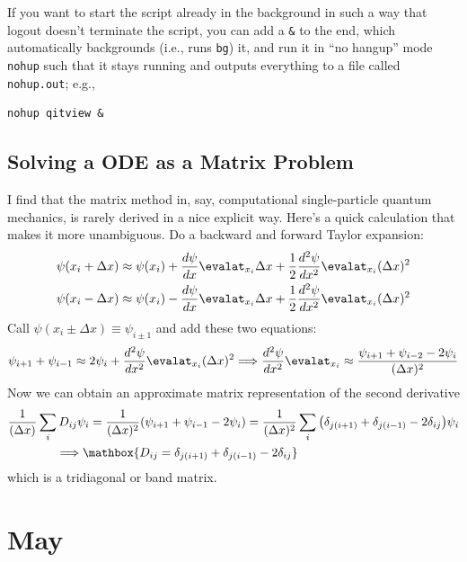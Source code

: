 \documentclass{report}
\begin{document}
If you want to start the script already in the background in such a way that 
logout doesn't terminate the script, you can add a \texttt{&} to the 
end, which automatically backgrounds (i.e., runs \texttt{bg}) it, and
run it in ``no hangup'' mode \texttt{nohup} such that it stays
running and outputs everything to a file called \texttt{nohup.out};
e.g., 
\begin{verbatim}
nohup qitview &
\end{verbatim}

\section{Solving a ODE as a Matrix Problem}
I find that the matrix method in, say, computational single-particle quantum 
mechanics, is rarely derived in a nice explicit way. Here's a quick calculation 
that makes it more unambiguous. Do a backward and forward Taylor expansion:
\begin{align*}
	\psi(x_i + \Delta x) \approx \psi(x_i) + \frac{d\psi}{dx}\evalat_{x_i}\Delta x 
		+ \frac{1}{2} \frac{d^2\psi}{dx^2}\evalat_{x_i}(\Delta x)^2\\
	\psi(x_i - \Delta x) \approx \psi(x_i) - \frac{d\psi}{dx}\evalat_{x_i}\Delta x 
		+ \frac{1}{2} \frac{d^2\psi}{dx^2}\evalat_{x_i}(\Delta x)^2
\end{align*}
Call $ \psi(x_i\pm \Delta x) \equiv \psi_{i\pm 1}$ and add these two equations:
\begin{equation*}
	\psi_{i+1} + \psi_{i-1} \approx 2\psi_i 
		+ \frac{d^2\psi}{dx^2}\evalat_{x_i}(\Delta x)^2
	\Longrightarrow \frac{d^2\psi}{dx^2}\evalat_{x_i} \approx 
		\frac{\psi_{i+1} + \psi_{i-2} - 2\psi_i}{(\Delta x)^2}
\end{equation*}
Now we can obtain an approximate matrix representation of the second derivative
\begin{align*}
	&\frac{1}{(\Delta x)} \sum_i D_{ij}\psi_{i} = \frac{1}{(\Delta x)^2}
		\qty( \psi_{i+1} + \psi_{i-1} - 2\psi_i )
	= \frac{1}{(\Delta x)^2}
		\sum_i \qty( \delta_{j(i+1)} + \delta_{j(i-1)} - 2 \delta_{ij} ) \psi_i\\
	&\qquad \qquad \Longrightarrow 
	\mathbox{D_{ij} = \delta_{j(i+1)} + \delta_{j(i-1)} - 2 \delta_{ij} }
\end{align*}
which is a tridiagonal or band matrix. 

\chapter{May} 
\begin{tocbox}
\minitoc
\end{tocbox}
\end{document}
